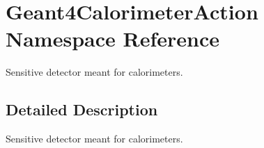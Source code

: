 \hypertarget{namespace_geant4_calorimeter_action}{}\section{Geant4\+Calorimeter\+Action Namespace Reference}
\label{namespace_geant4_calorimeter_action}


Sensitive detector meant for calorimeters.  




\subsection{Detailed Description}
Sensitive detector meant for calorimeters. 